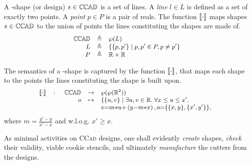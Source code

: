 
\begin{Definition} A \CCad-shape (or design) $s\in \mathbb{C}\mskip-1mu\mathbb{C}\mskip-1mu\mathbb{A}\mskip-1mu\mathbb{D} $ is a set of lines. 
A \emph{line} $l \in L$ is defined as a set of exactly two points.
A \emph{point} $p\in P$ is a pair of reals.
The function $\llbracket \cdot \rrbracket$ maps shapes $s\in \mathbb{C}\mskip-1mu\mathbb{C}\mskip-1mu\mathbb{A}\mskip-1mu\mathbb{D} $ to the union of points 
the lines constituting the shapes are made of.
\begin{displaymath}
   \begin{small}
      \begin{array}{rcl rcl}
         \CCAD &\eqdef& \wp(L) \\
         L     &\eqdef& \{ \{p, p'\} \;|\; p, p' \in P, p\neq p' \} \\
         P     &\eqdef& \mathbb{R} \times \mathbb{R}
      \end{array}
   \end{small}
\end{displaymath}

The semantics of a \CCad-shape is captured by the function 
$\llbracket \cdot \rrbracket$, that maps each shape to the points the lines constituting the 
shape is built upon. 
\begin{displaymath}
   \begin{small}
      \begin{array}{rcl}
         \SMapping & \colon & \!\!\!
            \begin{array}[t]{rcl}
               \CCAD &\to& \wp(\wp(\mathbb{R}^2)) \\
                   o &\mapsto& \lbrace \lbrace u,v\rbrace \;|\; \exists 
u,v\in \mathbb{R}.\; 
                    \forall x \leq u \leq x'. \\
& & v{=}m{*}u{+}\left(y{-}m{*}x\right), o{=}\lbrace \lbrace x, y \rbrace, \lbrace x', y' \rbrace \rbrace,
            \end{array}\\
      \end{array}
   \end{small}
\end{displaymath}
\noindent 
where $m = \frac{y'-y}{x'-x}$ and w.l.o.g. $x' \geq x$.
\end{Definition}
As minimal activities on \textsc{CCad} designs, one shall evidently 
\emph{create} shapes, \emph{check} their validity, viable 
cookie stencils, and ultimately \emph{manufacture} the cutters from 
the designs.



